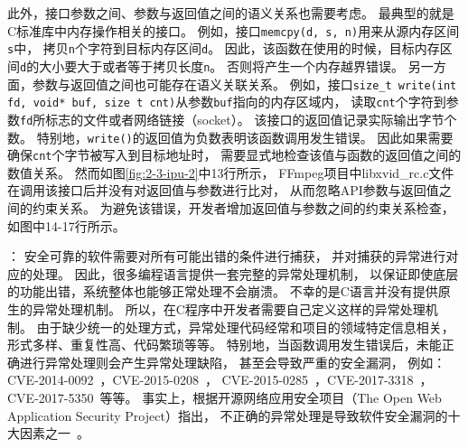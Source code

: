 
此外，接口参数之间、参数与返回值之间的语义关系也需要考虑。
最典型的就是C标准库中内存操作相关的接口。
例如，接口\texttt{memcpy(d, s, n)}用来从源内存区间\texttt{s}中，
拷贝\texttt{n}个字符到目标内存区间\texttt{d}。
因此，该函数在使用的时候，目标内存区间\texttt{d}的大小要大于或者等于拷贝长度\texttt{n}。
否则将产生一个内存越界错误。
另一方面，参数与返回值之间也可能存在语义关联关系。
例如，接口\texttt{size\_t write(int fd, void* buf, size t cnt)}从参数\texttt{buf}指向的内存区域内，
读取\texttt{cnt}个字符到参数\texttt{fd}所标志的文件或者网络链接（socket）。
该接口的返回值记录实际输出字节个数。
特别地，\texttt{write()}的返回值为负数表明该函数调用发生错误。
因此如果需要确保\texttt{cnt}个字节被写入到目标地址时，
需要显式地检查该值与函数的返回值之间的数值关系。
然而如图\ref{fig:2-3-ipu-2}中13行所示，
FFmpeg项目中libxvid\_rc.c文件在调用该接口后并没有对返回值与参数进行比对，
从而忽略API参数与返回值之间的约束关系。
为避免该错误，开发者增加返回值与参数之间的约束关系检查，如图中14-17行所示。

\vspace*{10pt}
\begin{center}
	\noindent{}
\end{center}


：
安全可靠的软件需要对所有可能出错的条件进行捕获，
并对捕获的异常进行对应的处理。
因此，很多编程语言提供一套完整的异常处理机制，
以保证即使底层的功能出错，系统整体也能够正常处理不会崩溃。
不幸的是C语言并没有提供原生的异常处理机制。
所以，在C程序中开发者需要自己定义这样的异常处理机制。
由于缺少统一的处理方式，异常处理代码经常和项目的领域特定信息相关，
形式多样、重复性高、代码繁琐等等。
特别地，当函数调用发生错误后，未能正确进行异常处理则会产生异常处理缺陷，
甚至会导致严重的安全漏洞，
例如：CVE-2014-0092~\cite{CVE-2014-0092}，CVE-2015-0208~\cite{CVE-2015-0208}，
CVE-2015-0285~\cite{CVE-2015-0285}，CVE-2017-3318~\cite{CVE-2017-3318}，
CVE-2017-5350~\cite{CVE-2017-5350}等等。
事实上，根据开源网络应用安全项目（The Open Web Application Security Project）指出，
不正确的异常处理是导致软件安全漏洞的十大因素之一~\cite{07-owasp}。




